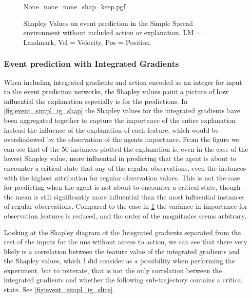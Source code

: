 \documentclass[UKenglish]{uiomasterthesis}
\begin{document}
\begin{figure}[H]
\centering
{None_none_none_shap_keep.pgf}
\caption{Shapley Values on event prediction in the Simple Spread environment without included action or explanation. LM = Landmark, Vel = Velocity, Pos = Position.}
\label{fig:event_simpl_shap}
\end{figure}

\subsubsection{Event prediction with Integrated Gradients}
When including integrated gradients and action encoded as an integer for input to the event prediction networks, the Shapley values paint a picture of how influential the explanation especially is for the predictions. In \cref{fig:event_simpl_ig_shap} the Shapley values for the integrated gradients have been aggregated together to capture the importance of the entire explanation instead the influence of the explanation of each feature, which would be overshadowed by the observation of the agents importance. From the figure we can see that of the 50 instances plotted the explanation is, even in the case of the lowest Shapley value, more influential in predicting that the agent is about to encounter a critical state that any of the regular observations, even the instances with the highest attribution for regular observation values. This is not the case for predicting when the agent is not about to encounter a critical state, though the mean is still significantly more influential than the most influential instances of regular observations. Compared to the case in \cref{fig:event_simpl_shap} the variance in importance for observation features is reduced, and the order of the magnitudes seems arbitrary.

Looking at the Shapley diagram of the Integrated gradients separated from the rest of the inputs for the \acp{nn} without access to action, we can see that there very likely is a correlation between the feature value of the integrated gradients and the Shapley values, which I did consider as a possibility when performing the experiment, but to reiterate, that is not the only correlation between the integrated gradients and whether the following sub-trajectory contains a critical state. See \cref{fig:event_simpl_ig_slice}.
\end{document}
